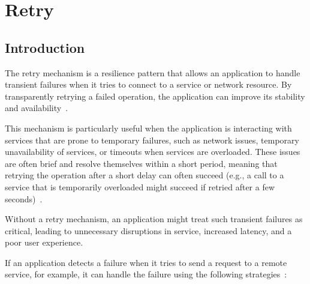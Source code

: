 \chapter{Retry}\label{ch:retry}


\section{Introduction}\label{sec:retry-context}

The retry mechanism is a resilience pattern that allows an application to handle transient failures when it tries to connect to a service or network resource.
By transparently retrying a failed operation, the application can improve its stability and availability~\cite{microsoft-retry-pattern}.

This mechanism is particularly useful when the application is interacting with services that are prone to temporary failures, such as network issues, temporary unavailability of services, or timeouts when services are overloaded.
These issues are often brief and resolve themselves within a short period, meaning that retrying the operation after a short delay can often succeed (e.g., a call to a service that is temporarily overloaded might succeed if retried after a few seconds)~\cite{microsoft-retry-pattern}.

Without a retry mechanism, an application might treat such transient failures as critical, leading to unnecessary disruptions in service, increased latency, and a poor user experience.

If an application detects a failure when it tries to send a request to a remote service, for example, it can handle the failure using the following strategies~\cite{microsoft-retry-pattern}:

